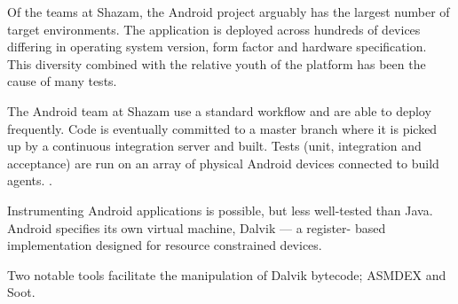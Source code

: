Of the teams at Shazam, the Android project arguably has the largest number of
target environments. The application is deployed across hundreds of devices
differing in operating system version, form factor and hardware specification.
This diversity combined with the relative youth of the platform has been the
cause of many \flaky tests.

The Android team at Shazam use a standard workflow and are able to deploy
frequently. Code is eventually committed to a master branch where it is picked
up by a continuous integration server and built. Tests (unit, integration and
acceptance) are run on an array of physical Android devices connected to build
agents. .

Instrumenting Android applications is possible, but less well-tested than Java.
Android specifies its own virtual machine, Dalvik\cite{dalvik} --- a register-
based implementation designed for resource constrained devices.

Two notable tools facilitate the manipulation of Dalvik bytecode;
ASMDEX\cite{asmDex} and Soot\cite{vall99soot}.
